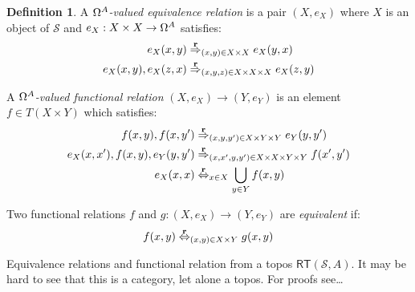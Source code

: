 \documentclass{amsart}
\theoremstyle{plain}
\theoremstyle{definition}
\newtheorem{defin}[theorem]{Definition}
\newcommand\hide[1]{}
\newcommand\cat\mathcal
\newcommand\set[1]{\left\{#1\right\}}
\newcommand\id{\mathrm{id}}
\begin{document}
\newcommand\rt{\mathsf{RT}}
\begin{defin} A \emph{$\Omega^ A$-valued equivalence relation} is a pair $(X,e_X)$ where $X$ is an object of $\cat S$ and $e_X:X\times X\to \Omega^ A$ satisfies:
\begin{align*}
e_X(x,y) &\stackrel{\mathrel{\bf r}}\Rightarrow_{(x,y)\in X\times X} e_X(y,x)\\
e_X(x,y), e_X(z,x) &\stackrel{\mathrel{\bf r}}\Rightarrow_{(x,y,z)\in X\times X\times X} e_X(z,y)
\end{align*}

A \emph{$\Omega^ A$-valued functional relation} $(X,e_X)\to (Y,e_Y)$ is an element $f\in T(X\times Y)$ which satisfies:
\begin{align*}
f(x,y),f(x,y')&\stackrel{\mathrel{\bf r}}\Rightarrow_{(x,y,y')\in X\times Y\times Y} e_Y(y,y')\\
e_X(x,x'),f(x,y),e_Y(y,y')&\stackrel{\mathrel{\bf r}}\Rightarrow_{(x,x',y,y')\in X\times X\times Y\times Y} f(x',y')\\
e_X(x,x)&\stackrel{\mathrel{\bf r}}\Leftrightarrow_{x \in X} \bigcup_{y\in Y} f(x,y)\\
\end{align*}

Two functional relations $f$ and $g:(X,e_X) \to (Y,e_Y)$ are \emph{equivalent} if: 
\[ f(x,y)\stackrel{\mathrel{\bf r}}\Leftrightarrow_{(x,y)\in X\times Y} g(x,y) \]
\end{defin}

Equivalence relations and functional relation from a topos $\rt(\cat S,A)$. It may be hard to see that this is a category, let alone a topos. For proofs see\dots

\hide{
\subsection{Assemblies}

\newcommand\asm{\mathsf{Asm}}
An \emph{assembly} is a pair $(X,r_X)$ where $X$ in an object of $\cat S$ and $r_X$ is a morphism $X\to \pow A$ for which $r_X(x)$ is inhabited. A morphism $(X,r_X) \to (Y,r_Y)$ is a morphism $f:X\to Y$ such that $r_X(x)\rmodels_{x\in X} r_Y(f(x))$. Together these form the category of assemblies $\asm(\cat S,A)$.

There is a functor $J:\asm(\cat S,A) \to\rt(\cat S,A)$. For each assembly $(X,r_X)$, $J(X,r_X) = (X,\bigcup_{\delta_X}(r_X))$ where $\bigcup_{\delta_X}(r_X)$ is the fibrewise join along the diagonal map $\delta_X:X\to X\times X$, i.e. $\bigcup_{\delta_X}(r_X)(x,y) = \bigcup\set{r_X(z)|(x,y)=\delta_X(z)}$. For each morphism $f:(X,r_X)\to(Y,r_Y)$, $Jf = \bigcup_{(\id_X,f)}(r_Y\circ f)$. This functor is fully faithful, which makes $\asm(\cat S,A)$ a full subcategory of $\rt(\cat S,A)$.

There is a functor $\nabla: \cat S \to \asm(\cat S,A)$. For each object $X$, $\nabla X = (X, x\mapsto A:X\to \pow A)$. The functor $\nabla$ mapst each morphism to itself, adn is a full and faithful functor. Therefore $\cat S$ is a full subcategory of both $\asm(\cat S,A)$ and $\rt(\cat S,A)$.
}
\end{document}
